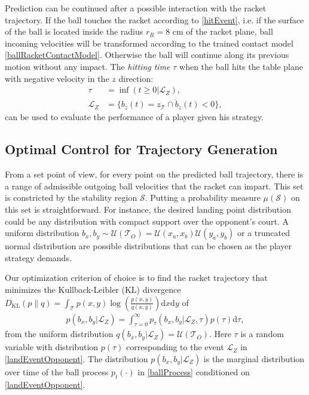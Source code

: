 \documentclass[letterpaper, 10 pt, conference]{ieeeconf}
\newcommand{\racketRadius}{r_R} %
\newcommand{\stabilityRegion}{\mathcal{S}} %
\newcommand{\courtOpponent}{\mathcal{T}_{O}} %
\newcommand{\court}{\mathcal{T}} %
\newcommand{\landTime}{\tau} %
\newcommand{\landEvent}{\mathcal{L}} %
\newcommand{\landDist}{p(\tau)} %
\newcommand{\KL}{D_{\mathrm{KL}}}
\begin{document}
%
Prediction can be continued after a possible interaction with the racket trajectory. If the ball touches the racket according to \eqref{hitEvent}, i.e. if the surface of the ball is located inside the radius $\racketRadius = 8$ cm of the racket plane, ball incoming velocities will be transformed according to the trained contact model \eqref{ballRacketContactModel}. Otherwise the ball will continue along its previous motion without any impact. The \emph{hitting time} $\landTime$ when the ball hits the table plane with negative velocity in the $z$ direction: 
%
\begin{align}
\landTime &= \inf(t \geq 0 | \landEvent_{Z}), \label{landTime}\\
\landEvent_{Z} &= \{b_z(t) = z_{\court} \cap \dot{b}_z(t) < 0\} \label{landEventOpponent}, 
\end{align}
%
can be used to evaluate the performance of a player given his strategy.

\subsection{Optimal Control for Trajectory Generation}

From a set point of view, for every point on the predicted ball trajectory, there is a range of admissible outgoing ball velocities that the racket can impart. This set is constricted by the stability region $\stabilityRegion$. 
Putting a probability measure $\mu(\stabilityRegion)$ on this set is straightforward. For instance, the desired landing point distribution could be any distribution with compact support over the opponent's court. A uniform distribution $b_x, b_y \sim \mathcal{U}(\courtOpponent) = \mathcal{U}(x_{a},x_{b})\mathcal{U}(y_{a},y_{b})$ or a truncated normal distribution are possible distributions that can be chosen as the player strategy demands. 
%

Our optimization criterion of choice is to find the racket trajectory that minimizes the Kullback-Leibler (KL) divergence $\KL(p\|q) = \int_{\court}p(x,y)\log(\frac{p(x,y)}{q(x,y)})\textrm{d}x\textrm{d}y$ of 
%
\begin{align}
p(b_x,b_y|\landEvent_{Z}) = \int_{\landTime = 0}^{\infty} p_{\landTime}(b_x,b_y|\landEvent_{Z},\landTime)\landDist \textrm{d}\landTime,
\label{marginalProcess}
\end{align}
%
\noindent from the uniform distribution $q(b_x,b_y|\landEvent_{Z}) = \mathcal{U}(\court_{O})$. Here $\landTime$ is a random variable with distribution $p(\landTime)$ corresponding to the event $\landEvent_{Z}$ in \eqref{landEventOpponent}. 
The distribution $p(b_x,b_y|\landEvent_{Z})$ is the marginal distribution over time of the ball process $p_t(\cdot)$ in \eqref{ballProcess} conditioned on \eqref{landEventOpponent}.
\end{document}
